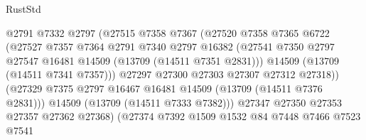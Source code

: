 \begin{lexlean}{RustStd}
\begin{coremodule}
                                    @2791
                                    @7332
                                    @2797
                                    (@27515
                                      @7358
                                      @7367
                                      (@27520
                                        @7358
                                        @7365
                                        @6722
                                        (@27527
                                          @7357
                                          @7364
                                          @2791
                                          @7340
                                          @2797
                                          @16382
                                          (@27541
                                            @7350
                                            @2797
                                            @27547
                                            @16481
                                            @14509
                                            (@13709 (@14511 @7351 @2831)))
                                          @14509
                                          (@13709 (@14511 @7341 @7357)))
                                        @27297
                                        @27300
                                        @27303
                                        @27307
                                        @27312
                                        @27318))
                                    (@27329
                                      @7375
                                      @2797
                                      @16467
                                      @16481
                                      @14509
                                      (@13709 (@14511 @7376 @2831)))
                                    @14509
                                    (@13709 (@14511 @7333 @7382)))
                                  @27347
                                  @27350
                                  @27353
                                  @27357
                                  @27362
                                  @27368)
                                (@27374
                                  @7392
                                  @1509
                                  @1532
                                  @84
                                  @7448
                                  @7466
                                  @7523
                                  @7541

\end{coremodule}
\end{lexlean}
